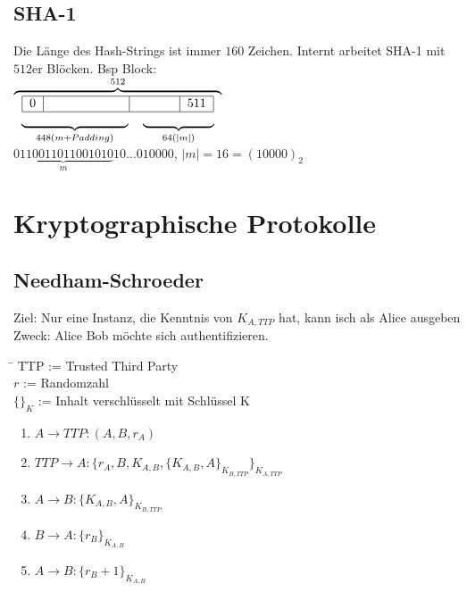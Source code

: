\documentclass[landscape,twocolumn,a4paper]{article}
\newcommand{\Abs}[1]{\left| #1 \right|} %
\begin{document}
\subsection{SHA-1}
Die Länge des Hash-Strings ist immer $160$ Zeichen. Internt arbeitet SHA-1 mit $512$er Blöcken. Bsp Block: \\
$\overbrace{
\begin{tabular}{cc}
 \multicolumn{2}{c}{\begin{tabular}{|c|c|l|c|}\hline
  0&\hspace*{2cm}&\hspace*{1cm}&511\\\hline
 \end{tabular}}\\
 $\underbrace{\hspace*{3cm}}_{448 (m + Padding)}$&$\underbrace{\hspace*{2cm}}_{64(|m|)}$
\end{tabular}}^{512}$\\
$\underbrace{0110011011001010}_m10\dots010000$, $\Abs{m}=16=(10000)_2$\\

\section{Kryptographische Protokolle}
\subsection{Needham-Schroeder}
Ziel: Nur eine Instanz, die Kenntnis von $K_{A,TTP}$ hat, kann isch als Alice ausgeben\\
Zweck: Alice Bob möchte sich authentifizieren.\\

\begin{tabbing}
\hspace{2em}\=\kill
TTP \> := Trusted Third Party\\
$r$ \> := Randomzahl\\
$\{\}_K$ \> := Inhalt verschlüsselt mit Schlüssel K\\
\end{tabbing} 

\begin{enumerate}
\item $A \rightarrow TTP: (A,B,r_A)$
\item $TTP \rightarrow A: \{r_A,B,K_{A,B},\{K_{A,B},A\}_{K_{B,TTP}}\}_{K_{A,TTP}}$
\item $A \rightarrow B: \{K_{A,B},A\}_{K_{B,TTP}}$
\item $B \rightarrow A: \{r_B\}_{K_{A,B}}$
\item $A \rightarrow B: \{r_B+1\}_{K_{A,B}}$
\end{enumerate}
\end{document}
